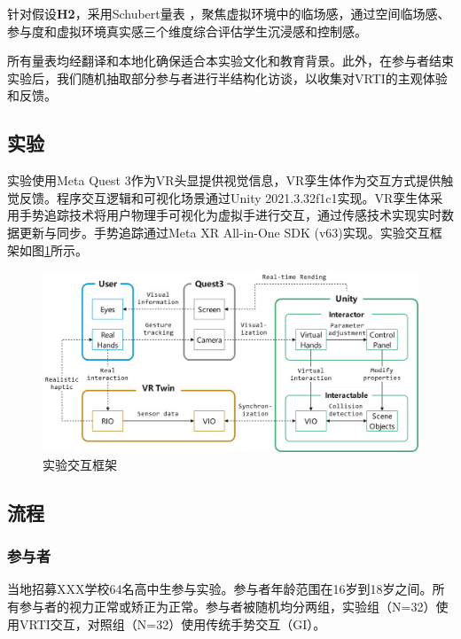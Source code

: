 \documentclass[runningheads]{llncs}
\begin{document}

针对假设\textbf{H2}，采用Schubert量表 \cite{schubert2001experience}，聚焦虚拟环境中的临场感，通过空间临场感、参与度和虚拟环境真实感三个维度综合评估学生沉浸感和控制感。

所有量表均经翻译和本地化确保适合本实验文化和教育背景。此外，在参与者结束实验后，我们随机抽取部分参与者进行半结构化访谈，以收集对VRTI的主观体验和反馈。

\subsection{实验}
实验使用Meta Quest 3作为VR头显提供视觉信息，VR孪生体作为交互方式提供触觉反馈。程序交互逻辑和可视化场景通过Unity 2021.3.32f1c1实现。VR孪生体采用手势追踪技术将用户物理手可视化为虚拟手进行交互，通过传感技术实现实时数据更新与同步。手势追踪通过Meta XR All-in-One SDK (v63)实现。实验交互框架如图\ref{fig:system-framework-flowchart}所示。

\begin{figure}[t]
  \centering
  \includegraphics[width=1\textwidth]{image/system-framework-flowchart.pdf}
  \caption{实验交互框架}
  \label{fig:system-framework-flowchart}
\end{figure}

\subsection{流程}
\subsubsection{参与者}
当地招募XXX学校64名高中生参与实验。参与者年龄范围在16岁到18岁之间。所有参与者的视力正常或矫正为正常。参与者被随机均分两组，实验组（N=32）使用VRTI交互，对照组（N=32）使用传统手势交互（GI）。
\end{document}
